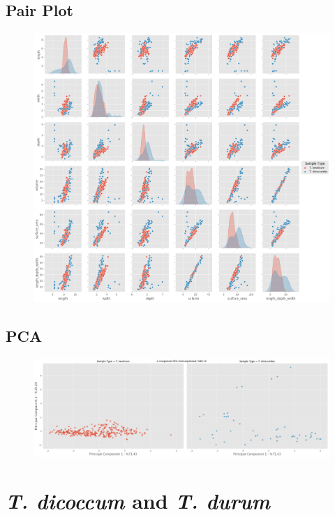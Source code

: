 \documentclass[11pt]{report}
\begin{document}
\subsection{Pair Plot}
\label{sec:org02942c7}

\begin{figure}[htbp]
\centering
\includegraphics[width=18cm]{./images/results/group4/pairplot.png}
\label{fig:orge26a2dc}
\end{figure}

\clearpage
\subsection{PCA}
\label{sec:org8af2444}
\begin{figure}[htbp]
\centering
\includegraphics[width=18cm]{./images/results/group4/pca.png}
\label{fig:orgc53924b}
\end{figure}


\clearpage
\section{\emph{T. dicoccum} and \emph{T. durum}}
\label{sec:orgd6a8a95}
\end{document}
